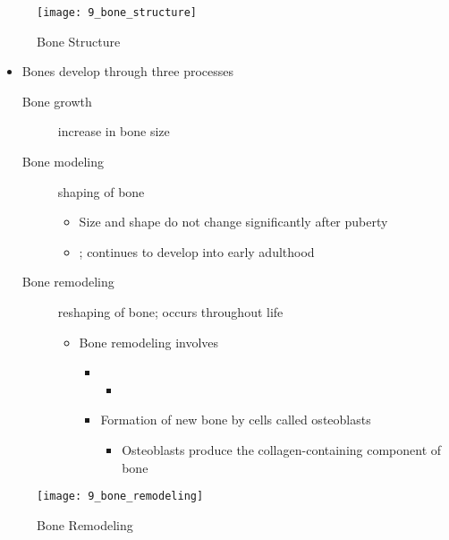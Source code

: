 \documentclass[title={Chapter 9}]{fdsn201notes}
\begin{document}
\begin{figure}[H]
	\centering
	\texttt{[image: 9\_bone\_structure]}
	\caption{Bone Structure}
	\label{fig:bone-structure}
\end{figure}

\begin{itemize}
	\item Bones develop through three processes
	\begin{description}
		\item[Bone growth] increase in bone size
		\item[Bone modeling] shaping of bone
		\begin{itemize}
			\item Size and shape do not change significantly after puberty
			\item {}; continues to develop into early adulthood
		\end{itemize}
		\item[Bone remodeling] reshaping of bone; occurs throughout life
		\begin{itemize}
			\item Bone remodeling involves
			\begin{itemize}
				\item {}
				\begin{itemize}
					\item {}
				\end{itemize}
				\item Formation of new bone by cells called osteoblasts
				\begin{itemize}
					\item Osteoblasts produce the collagen-containing component of bone
				\end{itemize}
			\end{itemize}
		\end{itemize}
	\end{description}
\end{itemize}

\begin{figure}[H]
	\centering
	\texttt{[image: 9\_bone\_remodeling]}
	\caption{Bone Remodeling}
	\label{fig:bone-remodeling}
\end{figure}
\end{document}
